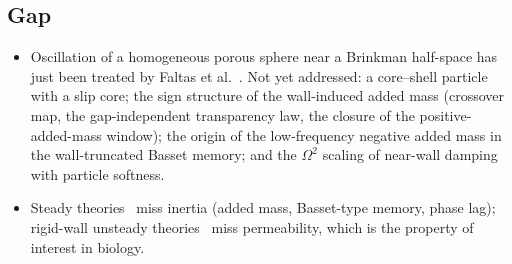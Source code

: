 \subsection*{Gap}
\begin{itemize}
  \item Oscillation of a homogeneous porous sphere near a Brinkman half-space has just been treated by Faltas et
        al.~\cite{faltas2026rectilinear}. Not yet addressed: a core--shell particle with a slip core; the sign structure of
        the wall-induced added mass (crossover map, the gap-independent transparency law, the closure of the
        positive-added-mass window); the origin of the low-frequency negative added mass in the wall-truncated Basset
        memory; and the $\Omega^2$ scaling of near-wall damping with particle softness.
  \item Steady theories~\cite{faltas2021axisymmetric} miss inertia (added mass, Basset-type memory, phase lag); rigid-wall unsteady
        theories~\cite{zhang2023unsteady} miss permeability, which is the property of interest in biology.
\end{itemize}

